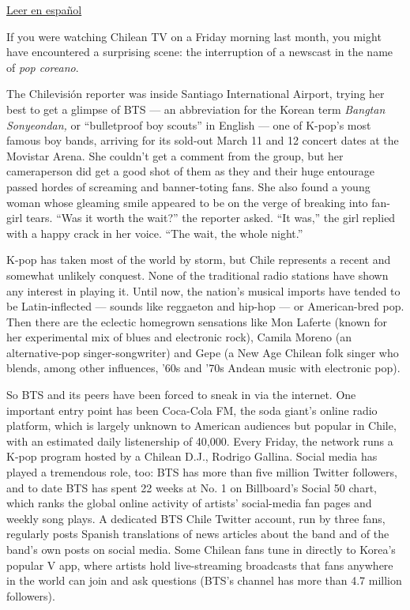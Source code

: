 \href{https://www.nytimes3xbfgragh.onion/es/2017/05/08/la-inesperada-popularidad-del-pop-coreano-en-chile/}{Leer
en español}

If you were watching Chilean TV on a Friday morning last month, you
might have encountered a surprising scene: the interruption of a
newscast in the name of \emph{pop coreano}.

The Chilevisión reporter was inside Santiago International Airport,
trying her best to get a glimpse of BTS --- an abbreviation for the
Korean term \emph{Bangtan Sonyeondan,} or ``bulletproof boy scouts'' in
English --- one of K-pop's most famous boy bands, arriving for its
sold-out March 11 and 12 concert dates at the Movistar Arena. She
couldn't get a comment from the group, but her cameraperson did get a
good shot of them as they and their huge entourage passed hordes of
screaming and banner-toting fans. She also found a young woman whose
gleaming smile appeared to be on the verge of breaking into fan-girl
tears. ``Was it worth the wait?'' the reporter asked. ``It was,'' the
girl replied with a happy crack in her voice. ``The wait, the whole
night.''

K-pop has taken most of the world by storm, but Chile represents a
recent and somewhat unlikely conquest. None of the traditional radio
stations have shown any interest in playing it. Until now, the nation's
musical imports have tended to be Latin-inflected --- sounds like
reggaeton and hip-hop --- or American-bred pop. Then there are the
eclectic homegrown sensations like Mon Laferte (known for her
experimental mix of blues and electronic rock), Camila Moreno (an
alternative-pop singer-songwriter) and Gepe (a New Age Chilean folk
singer who blends, among other influences, '60s and '70s Andean music
with electronic pop).

So BTS and its peers have been forced to sneak in via the internet. One
important entry point has been Coca-Cola FM, the soda giant's online
radio platform, which is largely unknown to American audiences but
popular in Chile, with an estimated daily listenership of 40,000. Every
Friday, the network runs a K-pop program hosted by a Chilean D.J.,
Rodrigo Gallina. Social media has played a tremendous role, too: BTS has
more than five million Twitter followers, and to date BTS has spent 22
weeks at No. 1 on Billboard's Social 50 chart, which ranks the global
online activity of artists' social-media fan pages and weekly song
plays. A dedicated BTS Chile Twitter account, run by three fans,
regularly posts Spanish translations of news articles about the band and
of the band's own posts on social media. Some Chilean fans tune in
directly to Korea's popular V app, where artists hold live-streaming
broadcasts that fans anywhere in the world can join and ask questions
(BTS's channel has more than 4.7 million followers).


